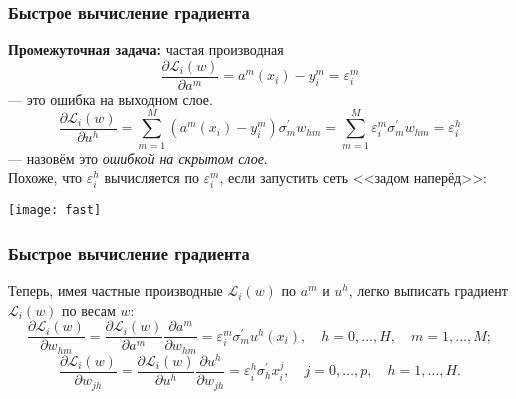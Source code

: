 \documentclass[unicode, notheorems]{beamer}
\begin{document}
\begin{frame}
	\frametitle{Быстрое вычисление градиента}
	\textbf{Промежуточная задача:} частая производная 
	\[
	\frac{\partial \mathscr{L}_i(w)}{\partial a^m} = a^m(x_i) - y_i^m = \varepsilon_i^m
	\]
	--- это ошибка на выходном слое.
	\[
	\frac{\partial \mathscr{L}_i(w)}{\partial u^h} = \sum_{m=1}^{M}(a^m(x_i) - y_i^m) \sigma^{'}_m w_{hm} =\sum_{m=1}^{M} \varepsilon_i^m  \sigma^{'}_m w_{hm} =\varepsilon_i^h
	\]
	--- назовём это \textit{ошибкой на скрытом слое}. \\
	\vspace{0.4cm}
	Похоже, что $\varepsilon_i^h$ вычисляется по $\varepsilon_i^m$, если запустить сеть <<задом наперёд>>:
	
	\texttt{[image: fast]}
	

\end{frame} 

\begin{frame}
	\frametitle{Быстрое вычисление градиента}
	Теперь, имея частные производные $\mathscr{L}_i(w)$ по $a^m$ и $u^h$, легко выписать градиент $\mathscr{L}_i(w)$ по весам $w$:
	\\
\small{
	\[\frac{\partial \mathscr{L}_i(w)}{\partial w_{hm}} = \frac{\partial \mathscr{L}_i(w)}{\partial a^m} \frac{\partial a^m}{\partial w_{hm}}=\varepsilon_i^m \sigma_m^{'} u^h(x_i), \quad h=0,\ldots,H, \quad  m=1,\ldots,M; \]
		\[
	\frac{\partial \mathscr{L}_i(w)}{\partial w_{jh}} = \frac{\partial \mathscr{L}_i(w)}{\partial u^h} \frac{\partial u^h}{\partial w_{jh}}=\varepsilon_i^h \sigma_h^{'} x_{i}^j, \quad j=0,\ldots,p, \quad h=1,\ldots,H.
	\]}
	\\
	\vspace{0.7cm} 
\end{frame} 
\end{document}
